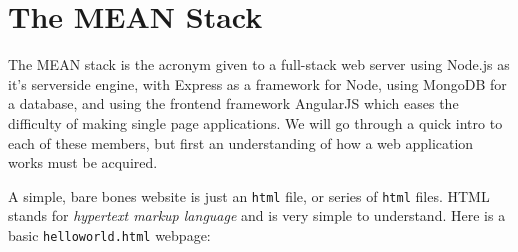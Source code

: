 \section{The MEAN Stack}

The MEAN stack is the acronym given to a full-stack web server using Node.js as
it's serverside engine, with Express as a framework for Node, using MongoDB for
a database, and using the frontend framework AngularJS which eases the 
difficulty of making single page applications. We will go through a quick intro
to each of these members, but first an understanding of how a web application
works must be acquired. 

A simple, bare bones website is just an \texttt{html} file, or series of
\texttt{html} files. HTML stands for \textit{hypertext markup language} and is 
very simple to understand. Here is a basic \texttt{helloworld.html} webpage:


\inputminted{html}{files/html/helloworld.html}








